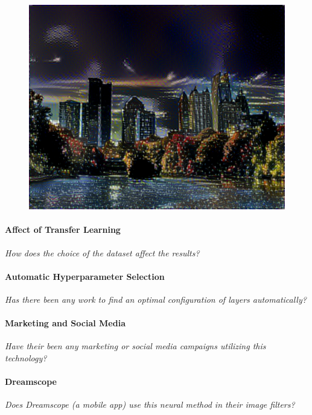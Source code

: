 \documentclass{article}
\begin{document}
\begin{figure}[htp]
    \begin{minipage}{0.3\linewidth}
    \includegraphics[width=\textwidth]{img/photo-transfer/x}
    \end{minipage}
\end{figure}


\paragraph{Affect of Transfer Learning} \textit{How does the choice of the
dataset affect the results?}

\paragraph{Automatic Hyperparameter Selection} \textit{Has there been any
work to find an optimal configuration of layers automatically?}

\paragraph{Marketing and Social Media} \textit{Have their been any marketing
or social media campaigns utilizing this technology?}

\paragraph{Dreamscope} \textit{Does Dreamscope (a mobile app) use this
neural method in their image filters?}
\end{document}
